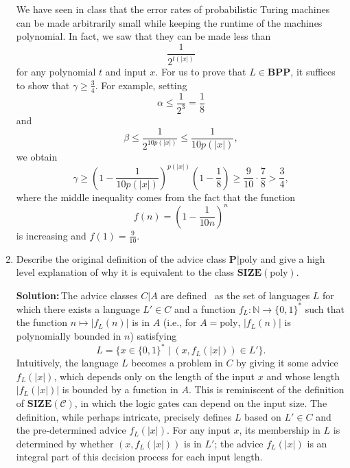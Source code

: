 \documentclass{amsart}
\theoremstyle{plain}
\theoremstyle{definition}
\newcommand{\N}{\mathbb{N}}
\newcommand{\size}[1]{\textbf{SIZE}(#1)}
\newcommand{\poly}{\text{poly}}
\newcommand{\advice}[2]{#1 | #2}
\newcommand{\bpp}{\textbf{BPP}}
\newcommand{\p}{\textbf{P}}
\newcommand{\sol}{\textbf{Solution:\,}}
\begin{document}
\begin{enumerate}[label=\textbf{Exercise \arabic*:}, leftmargin=0cm, labelwidth=-0.2cm, align=left]
            We have seen in class that the error rates of probabilistic Turing machines
            can be made arbitrarily small
            while keeping the runtime of the machines polynomial.
            In fact, we saw that they can be made less than
            \[
                \frac{1}{2^{t(|x|)}}
            \]
            for any polynomial $t$ and input $x$.
            For us to prove that $L \in \bpp$, it suffices to show that $\gamma \geq \frac{3}{4}$.
            For example, setting
            \[
                \alpha \leq \frac{1}{2^3} = \frac{1}{8}
            \]
            and
            \[
                \beta \leq \frac{1}{2^{10 p(|x|)}} \leq \frac{1}{10 p(|x|)},
            \]
            we obtain
            \[
                \gamma
                \geq \left(1 - \frac{1}{10 p(|x|)}\right)^{p(|x|)} \left( 1 - \frac{1}{8} \right)
                \geq \frac{9}{10} \cdot \frac{7}{8}
                > \frac{3}{4},
            \]
            where the middle inequality comes from the fact that the function
            \[
                f(n) = \left(1 - \frac{1}{10 n}\right)^{n}
            \]
            is increasing and $f(1) = \frac{9}{10}$.

        \newpage \item Describe the original definition of the advice class $\advice{\p}{\poly}$
        and give a high level explanation of why it is equivalent to the class $\size{\poly}$.

        \sol The advice classes $\advice{C}{A}$ are defined~\cite{karp1982turing} as the set of languages $L$
        for which there exists a language $L' \in C$ and a
        function $f_L: \N \to \{0, 1\}^*$ such that the function
        $n \mapsto |f_L(n)|$ is in $A$ (i.e., for $A=\poly$, $|f_L(n)|$ is polynomially bounded in $n$)
        satisfying
        \[
            L = \{x \in \{0, 1\}^* \mid (x, f_L(|x|)) \in L'\}.
        \]
        Intuitively, the language $L$ becomes a problem in $C$ by
        giving it some advice $f_L(|x|)$, which depends only on the length of the input $x$ and whose length $|f_L(|x|)|$ is bounded by a function in $A$.
        This is reminiscent of the definition of $\size{\mathcal{C}}$, in which the logic gates can depend on the input size.
        The definition, while perhaps intricate, precisely defines $L$ based on $L' \in C$ and the pre-determined advice $f_L(|x|)$.
        For any input $x$, its membership in $L$ is determined by whether
        $(x, f_L(|x|))$ is in $L'$; the advice $f_L(|x|)$ is an integral part of this decision process for each input length.


\end{enumerate}
\end{document}
